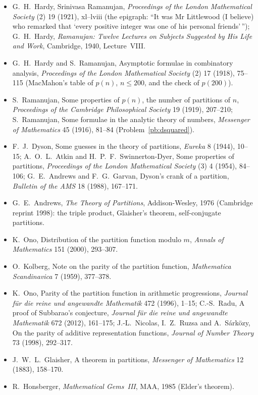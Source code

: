 \begin{itemize}
\item G.~H.~Hardy, Srinivasa Ramanujan, \emph{Proceedings of the London Mathematical Society} (2) 19 (1921), xl--lviii (the epigraph:
``It was Mr Littlewood (I believe) who remarked that `every positive integer was one of his personal friends'\,''); G.~H.~Hardy,
\emph{Ramanujan: Twelve Lectures on Subjects Suggested by His Life and Work}, Cambridge, 1940, Lecture~VIII.
\item G.~H.~Hardy and S.~Ramanujan, Asymptotic formulae in combinatory analysis, \emph{Proceedings of the London Mathematical
Society} (2) 17 (1918), 75--115 (MacMahon's table of $p(n)$, $n\le200$, and the check of $p(200)$).
\item S.~Ramanujan, Some properties of $p(n)$, the number of partitions of $n$, \emph{Proceedings of the Cambridge Philosophical
Society} 19 (1919), 207--210; S.~Ramanujan, Some formulae in the analytic theory of numbers, \emph{Messenger of Mathematics} 45
(1916), 81--84 (Problem~\ref{pb:dsquared}).
\item F.~J.~Dyson, Some guesses in the theory of partitions, \emph{Eureka} 8 (1944), 10--15; A.~O.~L.~Atkin and H.~P.~F.~Swinnerton-Dyer,
Some properties of partitions, \emph{Proceedings of the London Mathematical Society} (3) 4 (1954), 84--106; G.~E.~Andrews and
F.~G.~Garvan, Dyson's crank of a partition, \emph{Bulletin of the AMS} 18 (1988), 167--171.
\item G.~E.~Andrews, \emph{The Theory of Partitions}, Addison-Wesley, 1976 (Cambridge reprint 1998): the triple product, Glaisher's
theorem, self-conjugate partitions.
\item K.~Ono, Distribution of the partition function modulo $m$, \emph{Annals of Mathematics} 151 (2000), 293--307.
\item O.~Kolberg, Note on the parity of the partition function, \emph{Mathematica Scandinavica} 7 (1959), 377--378.
\item K.~Ono, Parity of the partition function in arithmetic progressions, \emph{Journal für die reine und angewandte Mathematik}
472 (1996), 1--15; C.-S.~Radu, A proof of Subbarao's conjecture, \emph{Journal für die reine und angewandte Mathematik} 672 (2012),
161--175; J.-L.~Nicolas, I.~Z.~Ruzsa and A.~Sárközy, On the parity of additive representation functions, \emph{Journal of Number
Theory} 73 (1998), 292--317.
\item J.~W.~L.~Glaisher, A theorem in partitions, \emph{Messenger of Mathematics} 12 (1883), 158--170.
\item R.~Honsberger, \emph{Mathematical Gems~III}, MAA, 1985 (Elder's theorem).

\end{itemize}
